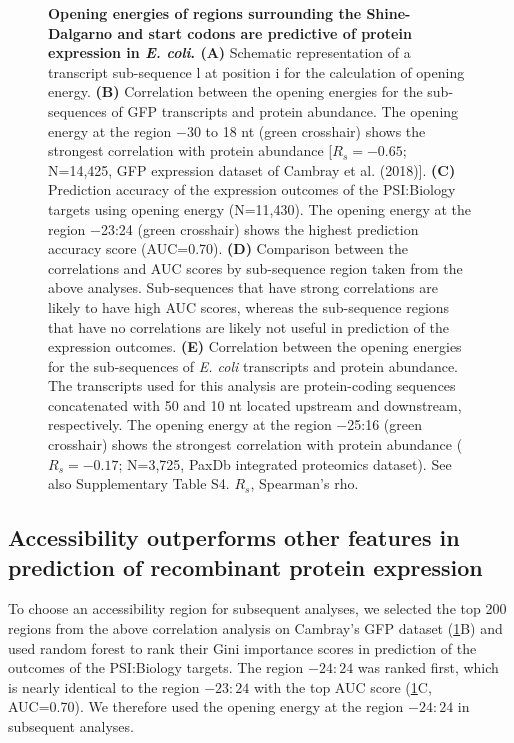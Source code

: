 \begin{figure}
	\caption[Opening energies of regions surrounding the Shine-Dalgarno and start codons are predictive of protein expression in \textit{E. coli}.]{\textbf{Opening energies of regions surrounding the Shine-Dalgarno and start codons are predictive of protein expression in \textit{E. coli}. (A)} Schematic representation of a transcript sub-sequence l at position i for the calculation of opening energy. \textbf{(B)} Correlation between the opening energies for the sub-sequences of GFP transcripts and protein abundance. The opening energy at the region −30 to 18 nt (green crosshair) shows the strongest correlation with protein abundance [$R_s=−0.65$; N=14,425, GFP expression dataset of Cambray et al. (2018)]. \textbf{(C)} Prediction accuracy of the expression outcomes of the PSI:Biology targets using opening energy (N=11,430). The opening energy at the region −23:24 (green crosshair) shows the highest prediction accuracy score (AUC=0.70). \textbf{(D)} Comparison between the correlations and AUC scores by sub-sequence region taken from the above analyses. Sub-sequences that have strong correlations are likely to have high AUC scores, whereas the sub-sequence regions that have no correlations are likely not useful in prediction of the expression outcomes. \textbf{(E)} Correlation between the opening energies for the sub-sequences of \textit{E. coli} transcripts and protein abundance. The transcripts used for this analysis are protein-coding sequences concatenated with 50 and 10 nt located upstream and downstream, respectively. The opening energy at the region −25:16 (green crosshair) shows the strongest correlation with protein abundance ($R_s=−0.17$; N=3,725, PaxDb integrated proteomics dataset). See also Supplementary Table S4. $R_s$, Spearman’s rho. }
	\label{fig:tisigner_fig2}
\end{figure}




\subsection{Accessibility outperforms other features in prediction of recombinant protein expression}
To choose an accessibility region for subsequent analyses, we selected the top 200 regions from the above correlation analysis on Cambray’s GFP dataset (\ref{fig:tisigner_fig2}B) and used random forest to rank their Gini importance scores in prediction of the outcomes of the PSI:Biology targets. The region $−24:24$ was ranked first, which is nearly identical to the region $−23:24$ with the top AUC score (\ref{fig:tisigner_fig2}C, AUC=0.70). We therefore used the opening energy at the region $−24:24$ in subsequent analyses.

